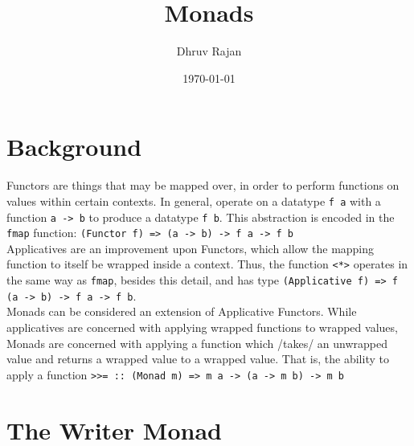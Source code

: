 \documentclass[12pt]{article}
\begin{document}
\title{Monads}
\author{Dhruv Rajan}
\date{\today}
\maketitle

\section{Background}

Functors are things that may be mapped over, in order to perform
functions on values within certain contexts. In general, operate on a
datatype \texttt{f a} with a function \texttt{a -> b} to produce a
datatype \texttt{f b}. This abstraction is encoded in the \texttt{fmap}
function: \texttt{(Functor f) => (a -> b) -> f a -> f b} \\

Applicatives are an improvement upon Functors, which allow the mapping
function to itself be wrapped inside a context. Thus, the function
\texttt{<*>} operates in the same way as \texttt{fmap}, besides this
detail, and has type \texttt{(Applicative f) => f (a -> b) -> f a -> f b}. \\

Monads can be considered an extension of Applicative Functors. While
applicatives are concerned with applying wrapped functions to wrapped
values, Monads are concerned with applying a function which /takes/ an
unwrapped value and returns a wrapped value to a wrapped value. That
is, the ability to apply a function \texttt{>>= :: (Monad m) => m a ->
  (a -> m b) -> m b} \\

\section{The Writer Monad}
\end{document}
